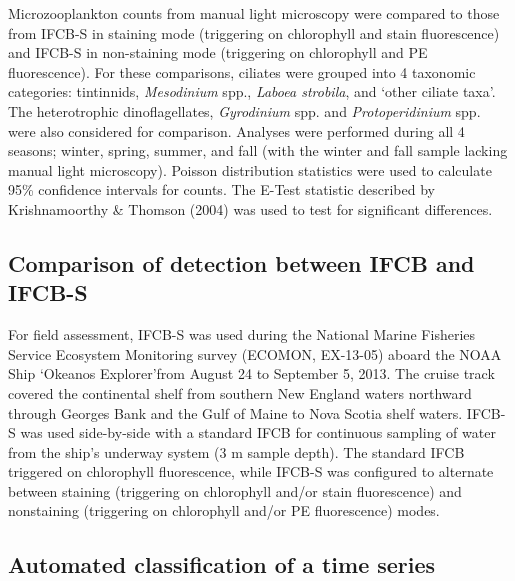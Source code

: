 Microzooplankton counts from manual light microscopy were compared to those from IFCB-S in staining mode (triggering on chlorophyll and stain fluorescence) and IFCB-S in non-staining mode (triggering on chlorophyll and PE fluorescence). For these comparisons, ciliates were grouped into 4 taxonomic categories: tintinnids, \textit{Mesodinium} spp., \textit{Laboea strobila}, and \lq{other ciliate taxa}\rq. The heterotrophic dinoflagellates, \textit{Gyrodinium} spp. and \textit{Protoperidinium} spp. were also considered for comparison. Analyses were performed during all 4 seasons; winter, spring, summer, and fall (with the winter and fall sample lacking manual light microscopy). Poisson distribution statistics were used to calculate 95\% confidence intervals for counts. The E-Test statistic described by Krishnamoorthy \& Thomson (2004) was used to test for significant differences.

\subsection{Comparison of detection between IFCB and IFCB-S}

For field assessment, IFCB-S was used during the National Marine Fisheries Service Ecosystem Monitoring survey (ECOMON, EX-13-05) aboard the NOAA Ship  \lq{Okeanos Explorer}\rq from August 24 to September 5, 2013. The cruise track covered the continental shelf from southern New England waters northward through Georges Bank and the Gulf of Maine to Nova Scotia shelf waters. IFCB-S was used side-by-side with a standard IFCB for continuous sampling of water from the ship's underway system (3 m sample depth). The standard IFCB triggered on chlorophyll fluorescence, while IFCB-S was configured to alternate between staining (triggering on chlorophyll and/or stain fluorescence) and nonstaining (triggering on chlorophyll and/or PE fluorescence) modes.

\subsection{Automated classification of a time series}

